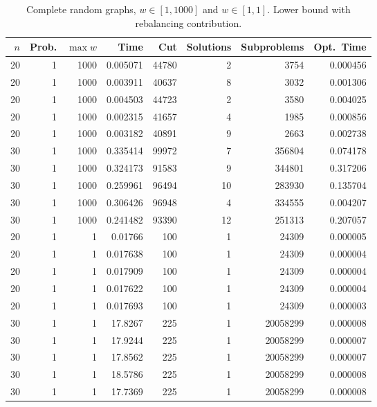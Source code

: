 \documentclass[a4paper,11pt]{article}
\begin{document}
\begin{table}
\begin{center}
\begin{tabular}{|rrr|r|r|rr|r|}
\hline
$n$ & Prob. & $\max w$ & Time & Cut & Solutions & Subproblems & Opt.\ Time \\
\hline
20 & 1 & 1000 & 0.005071 & 44780 & 2 & 3754 & 0.000456 \\
20 & 1 & 1000 & 0.003911 & 40637 & 8 & 3032 & 0.001306 \\
20 & 1 & 1000 & 0.004503 & 44723 & 2 & 3580 & 0.004025 \\
20 & 1 & 1000 & 0.002315 & 41657 & 4 & 1985 & 0.000856 \\
20 & 1 & 1000 & 0.003182 & 40891 & 9 & 2663 & 0.002738 \\
30 & 1 & 1000 & 0.335414 & 99972 & 7 & 356804 & 0.074178 \\
30 & 1 & 1000 & 0.324173 & 91583 & 9 & 344801 & 0.317206 \\
30 & 1 & 1000 & 0.259961 & 96494 & 10 & 283930 & 0.135704 \\
30 & 1 & 1000 & 0.306426 & 96948 & 4 & 334555 & 0.004207 \\
30 & 1 & 1000 & 0.241482 & 93390 & 12 & 251313 & 0.207057 \\
\hline
20 & 1 & 1 & 0.01766 & 100 & 1 & 24309 & 0.000005 \\
20 & 1 & 1 & 0.017638 & 100 & 1 & 24309 & 0.000004 \\
20 & 1 & 1 & 0.017909 & 100 & 1 & 24309 & 0.000004 \\
20 & 1 & 1 & 0.017622 & 100 & 1 & 24309 & 0.000004 \\
20 & 1 & 1 & 0.017693 & 100 & 1 & 24309 & 0.000003 \\
30 & 1 & 1 & 17.8267 & 225 & 1 & 20058299 & 0.000008 \\
30 & 1 & 1 & 17.9244 & 225 & 1 & 20058299 & 0.000007 \\
30 & 1 & 1 & 17.8562 & 225 & 1 & 20058299 & 0.000007 \\
30 & 1 & 1 & 18.5786 & 225 & 1 & 20058299 & 0.000008 \\
30 & 1 & 1 & 17.7369 & 225 & 1 & 20058299 & 0.000008 \\
\hline
\end{tabular}
\end{center}
\caption{Complete random graphs, $w\in[1,1000]$ and $w\in[1,1]$. Lower
  bound with rebalancing contribution.}
\label{tab:complete-rebal}
\end{table}
\end{document}
